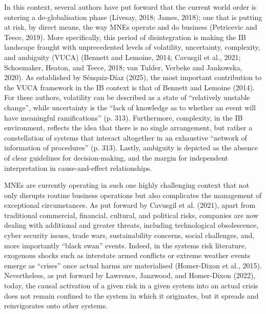\documentclass[12pt,a4paper]{article}
\begin{document}
In this context, several authors have put forward that the current world order is entering a de-globalisation phase (Livesay, 2018; James, 2018); one that is putting at risk, by direct means, the way MNEs operate and do business (Petricevic and Teece, 2019). More specifically, this period of disintegration is making the IB landscape fraught with unprecedented levels of volatility, uncertainty, complexity, and ambiguity (VUCA) (Bennett and Lemoine, 2014; Cavusgil et al., 2021; Schoemaker, Heaton, and Teece, 2018; van Tulder, Verbeke and Jankowska, 2020). As established by Sénquiz-Díaz (2025), the most important contribution to the VUCA framework in the IB context is that of Bennett and Lemoine (2014). For these authors, volatility can be described as a state of “relatively unstable change”, while uncertainty is the “lack of knowledge as to whether an event will have meaningful ramifications” (p. 313). Furthermore, complexity, in the IB environment, reflects the idea that there is no single arrangement, but rather a constellation of systems that interact altogether in an exhaustive “network of information of procedures” (p. 313). Lastly, ambiguity is depicted as the absence of clear guidelines for decision-making, and the margin for independent interpretation in cause-and-effect relationships. 

MNEs are currently operating in such one highly challenging context that not only disrupts routine business operations but also complicates the management of exceptional circumstances. As put forward by Cavusgil et al. (2021), apart from traditional commercial, financial, cultural, and political risks, companies are now dealing with additional and greater threats, including technological obsolescence, cyber security issues, trade wars, sustainability concerns, social challenges, and, more importantly “black swan” events. Indeed, in the systems risk literature, exogenous shocks such as interstate armed conflicts or extreme weather events emerge as “crises” once actual harms are materialised (Homer-Dixon et al., 2015). Nevertheless, as put forward by Lawrence, Janzwood, and Homer-Dixon (2022), today, the causal activation of a given risk in a given system into an actual crisis does not remain confined to the system in which it originates, but it spreads and reinvigorates onto other systems. 
\end{document}
